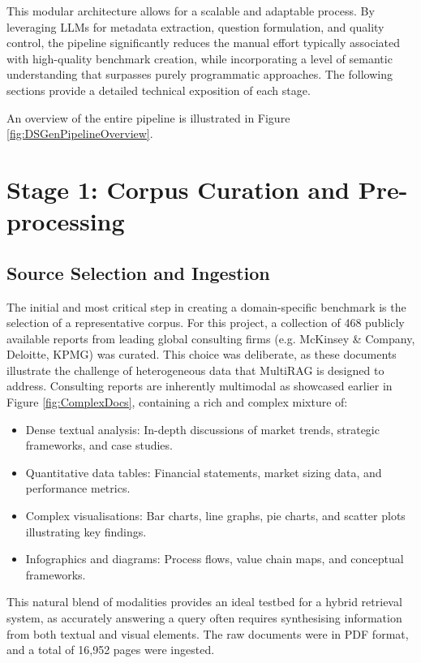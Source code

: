 \documentclass[12pt,twoside]{report}
\begin{document}
This modular architecture allows for a scalable and adaptable process. By leveraging LLMs for metadata extraction, question formulation, and quality control, the pipeline significantly reduces the manual effort typically associated with high-quality benchmark creation, while incorporating a level of semantic understanding that surpasses purely programmatic approaches. The following sections provide a detailed technical exposition of each stage.

An overview of the entire pipeline is illustrated in Figure \ref{fig:DSGenPipelineOverview}.

\section{Stage 1: Corpus Curation and Pre-processing}

\subsection{Source Selection and Ingestion}

The initial and most critical step in creating a domain-specific benchmark is the selection of a representative corpus. For this project, a collection of 468 publicly available reports from leading global consulting firms (e.g. McKinsey \& Company, Deloitte, KPMG) was curated. This choice was deliberate, as these documents illustrate the challenge of heterogeneous data that MultiRAG is designed to address. Consulting reports are inherently multimodal as showcased earlier in Figure \ref{fig:ComplexDocs}, containing a rich and complex mixture of:

\begin{itemize}
\item{Dense textual analysis}: In-depth discussions of market trends, strategic frameworks, and case studies.

\item{Quantitative data tables}: Financial statements, market sizing data, and performance metrics.

\item{Complex visualisations}: Bar charts, line graphs, pie charts, and scatter plots illustrating key findings.

\item{Infographics and diagrams}: Process flows, value chain maps, and conceptual frameworks.
\end{itemize}

This natural blend of modalities provides an ideal testbed for a hybrid retrieval system, as accurately answering a query often requires synthesising information from both textual and visual elements. The raw documents were in PDF format, and a total of 16,952 pages were ingested.
\end{document}
